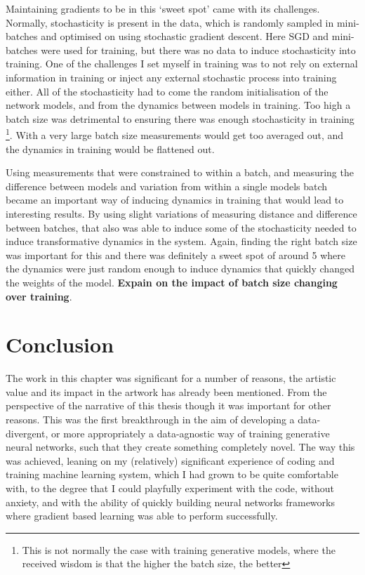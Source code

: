 Maintaining gradients to be in this ‘sweet spot’ came with its challenges. 
Normally, stochasticity is present in the data, which is randomly sampled in mini-batches and optimised on using stochastic gradient descent. 
Here SGD and mini-batches were used for training, but there was no data to induce stochasticity into training. 
One of the challenges I set myself in training was to not rely on external information in training or inject any external stochastic process into training either. 
All of the stochasticity had to come the random initialisation of the network models, and from the dynamics between models in training. 
Too high a batch size was detrimental to ensuring there was enough stochasticity in training \footnote{This is not normally the case with training generative models, where the received wisdom is that the higher the batch size, the better}. 
With a very large batch size measurements would get too averaged out, and the dynamics in training would be flattened out. 

Using measurements that were constrained to within a batch, and measuring the difference between models and variation from within a single models batch became an important way of inducing dynamics in training that would lead to interesting results. 
By using slight variations of measuring distance and difference between batches, that also was able to induce some of the stochasticity needed to induce transformative dynamics in the system. 
Again, finding the right batch size was important for this and there was definitely a sweet spot of around 5 where the dynamics were just random enough to induce dynamics that quickly changed the weights of the model. 
\textbf{Expain on the impact of batch size changing over training}.

\section{Conclusion}

The work in this chapter was significant for a number of reasons, the artistic value and its impact in the artwork has already been mentioned. 
From the perspective of the narrative of this thesis though it was important for other reasons. 
This was the first breakthrough in the aim of developing a data-divergent, or more appropriately a data-agnostic way of training generative neural networks, such that they create something completely novel. 
The way this was achieved, leaning on my (relatively) significant experience of coding and training machine learning system, which I had grown to be quite comfortable with, to the degree that I could playfully experiment with the code, without anxiety, and with the ability of quickly building neural networks frameworks where gradient based learning was able to perform successfully.

